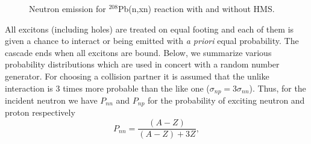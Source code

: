 \documentclass[twocolumn,amsmath,amssymb,10pt,groupedaddress,a4paper]{revtex4}
\begin{document}
\begin{figure}[htbp]
\caption{Neutron emission for $^{208}$Pb(n,xn) reaction with and without HMS.}
\label{pb208HMS}
\end{figure}




All excitons (including holes) are treated on equal footing and each
of them is given a chance to interact or being emitted with \emph{a
priori} equal probability. The cascade ends when all excitons are
bound. Below, we summarize various probability distributions which
are used in concert with a random number generator.
For choosing a collision partner it is assumed that the unlike interaction
is 3 times more probable than the like one ($\sigma_{np}=3\sigma_{nn}$).
Thus, for the incident neutron we have $P_{nn}$ and $P_{np}$ for
the probability of exciting neutron and proton respectively
\begin{equation}
P_{nn}=\frac{(A-Z)}{(A-Z)+3Z},\label{Pnn}\end{equation}
\end{document}
